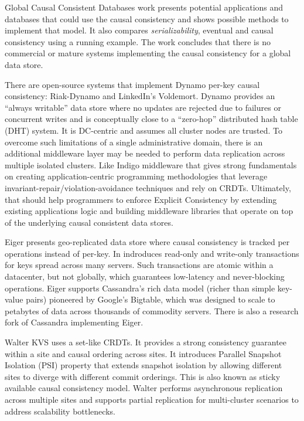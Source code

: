 \documentclass[conference]{IEEEtran}
\begin{document}
Global Causal Consistent Databases\cite{b6} work presents potential
applications and databases that could use the causal consistency and shows
possible methods to implement that model. It also compares
\textit{serializability}\cite{b4}, eventual and causal consistency using a
running example. The work concludes that there is no commercial or mature
systems implementing the causal consistency for a global data store.

There are open-source systems that implement Dynamo\cite{b17} per-key causal
consistency: Riak-Dynamo\cite{b19} and LinkedIn's Voldemort\cite{b20}. Dynamo
provides an ``always writable'' data store where no updates are rejected due
to failures or concurrent writes and is conceptually close to a ``zero-hop''
distributed hash table (DHT) system. It is DC-centric and assumes all cluster
nodes are trusted. To overcome such limitations of a single administrative
domain, there is an additional middleware layer may be needed to perform data
replication across multiple isolated clusters. Like Indigo middleware\cite{b10}
that gives strong fundamentals on creating application-centric programming
methodologies that leverage invariant-repair/violation-avoidance techniques and
rely on CRDTs. Ultimately, that should help programmers to enforce Explicit
Consistency by extending existing applications logic and building middleware
libraries that operate on top of the underlying causal consistent data stores.

Eiger\cite{b1} presents geo-replicated data store where causal consistency is
tracked per operations instead of per-key. In indroduces read-only and
write-only transactions for keys spread across many servers. Such transactions
are atomic within a datacenter, but not globally, which guarantees low-latency
and never-blocking operations. Eiger supports Cassandra's\cite{b25} rich data
model (richer than simple key-value pairs) pioneered by Google's Bigtable\cite{b26},
which was designed to scale to petabytes of data across thousands of commodity
servers. There is also a research fork of Cassandra implementing Eiger\cite{b23}.

Walter\cite{b11} KVS uses a set-like CRDTs. It provides a strong consistency
guarantee within a site and causal ordering across sites. It introduces
Parallel Snapshot Isolation (PSI) property that extends snapshot isolation by
allowing different sites to diverge with different commit orderings. This is
also known as sticky available causal consistency model. Walter performs
asynchronous replication across multiple sites and supports partial replication
for multi-cluster scenarios to address scalability bottlenecks.
\end{document}
